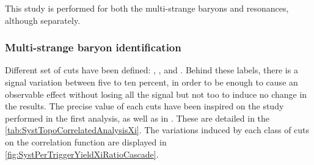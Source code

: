 This study is performed for both the multi-strange baryons and \rmPhiMes resonances, although separately.

\subsubsection{Multi-strange baryon identification}

Different set of cuts have been defined: , ,  and . Behind these labels, there is a signal variation between five to ten percent, in order to be  enough to cause an observable effect without losing all the signal but not too  to induce no change in the results. The precise value of each cuts have been inspired on the study performed in the first analysis, as well as in \cite{alicecollaborationMultiplicityDependenceMulti2020}. These are detailed in the \tab\ref{tab:SystTopoCorrelatedAnalysisXi}. The variations induced by each class of cuts on the correlation function are displayed in \figs\ref{fig:SystPerTriggerYieldXiRatioCascade}. 


